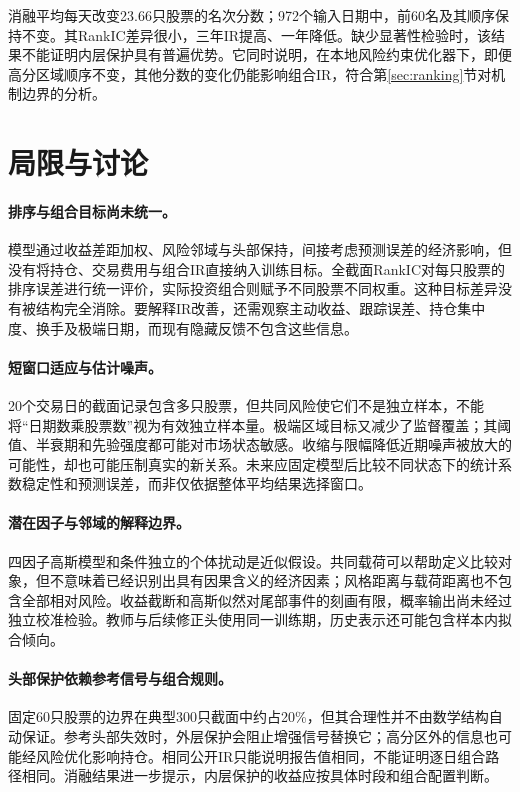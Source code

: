 \documentclass[UTF8,11pt,a4paper,fontset=fandol]{ctexart}
\begin{document}
消融平均每天改变23.66只股票的名次分数；972个输入日期中，前60名及其顺序保持不变。其RankIC差异很小，三年IR提高、一年降低。缺少显著性检验时，该结果不能证明内层保护具有普遍优势。它同时说明，在本地风险约束优化器下，即便高分区域顺序不变，其他分数的变化仍能影响组合IR，符合第\ref{sec:ranking}节对机制边界的分析。

\section{局限与讨论}
\paragraph{排序与组合目标尚未统一。}
模型通过收益差距加权、风险邻域与头部保持，间接考虑预测误差的经济影响，但没有将持仓、交易费用与组合IR直接纳入训练目标。全截面RankIC对每只股票的排序误差进行统一评价，实际投资组合则赋予不同股票不同权重。这种目标差异没有被结构完全消除。要解释IR改善，还需观察主动收益、跟踪误差、持仓集中度、换手及极端日期，而现有隐藏反馈不包含这些信息。

\paragraph{短窗口适应与估计噪声。}
20个交易日的截面记录包含多只股票，但共同风险使它们不是独立样本，不能将“日期数乘股票数”视为有效独立样本量。极端区域目标又减少了监督覆盖；其阈值、半衰期和先验强度都可能对市场状态敏感。收缩与限幅降低近期噪声被放大的可能性，却也可能压制真实的新关系。未来应固定模型后比较不同状态下的统计系数稳定性和预测误差，而非仅依据整体平均结果选择窗口。

\paragraph{潜在因子与邻域的解释边界。}
四因子高斯模型和条件独立的个体扰动是近似假设。共同载荷可以帮助定义比较对象，但不意味着已经识别出具有因果含义的经济因素；风格距离与载荷距离也不包含全部相对风险。收益截断和高斯似然对尾部事件的刻画有限，概率输出尚未经过独立校准检验。教师与后续修正头使用同一训练期，历史表示还可能包含样本内拟合倾向。

\paragraph{头部保护依赖参考信号与组合规则。}
固定60只股票的边界在典型300只截面中约占20\%，但其合理性并不由数学结构自动保证。参考头部失效时，外层保护会阻止增强信号替换它；高分区外的信息也可能经风险优化影响持仓。相同公开IR只能说明报告值相同，不能证明逐日组合路径相同。消融结果进一步提示，内层保护的收益应按具体时段和组合配置判断。
\end{document}
